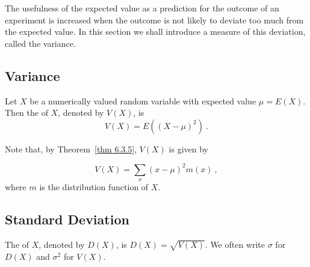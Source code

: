 The usefulness of the expected value as a prediction for the outcome of an experiment
is increased when the outcome is not likely to deviate too much from the expected
value.  In this section we shall introduce a measure of this deviation, called the
variance.

\subsection*{Variance}


\begin{definition}\label{def 6.4} Let $X$ be a numerically valued random variable
with expected value $\mu = E(X)$.  Then the   of $X$, denoted by
$V(X)$, is
$$ V(X) = E((X - \mu)^2)\ .
$$
\end{definition} Note that, by Theorem~\ref{thm 6.3.5}, $V(X)$ is given by

\begin{equation} V(X) = \sum_x (x - \mu)^2 m(x)\ , 
\label{eq 6.1}
\end{equation} where $m$ is the distribution function of $X$.

\subsection*{Standard Deviation}

The   of $X$, denoted by $D(X)$, is $D(X) =
\sqrt {V(X)}$.  We often write $\sigma$ for $D(X)$ and $\sigma^2$ for $V(X)$.



